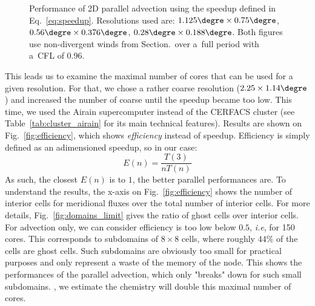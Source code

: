 \begin{figure}
  \hfill
  \caption{%
    Performance of 2D parallel advection using the speedup defined in
    Eq.~\eqref{eq:speedup}. Resolutions used are:
    $1.125{\degre}\times0.75\degre$, $0.56{\degre}\times0.376\degre$,
    $0.28{\degre}\times0.188\degre$. Both figures use non-divergent winds from
    Section.~\DIFdelbeginFL \DIFdelFL{\ref{sec:tests} }\DIFdelendFL \DIFaddbeginFL \DIFaddFL{\ref{sec2:tests} }\DIFaddendFL over a~full period with a~CFL of 0.96.
  }
\end{figure}

This leads us to examine the maximal number of cores that can be used for a
given resolution. For that, we chose a rather coarse resolution
($2.25\times1.14\degre$) and increased the number of coarse until the speedup
became too low. This time, we used the Airain supercomputer instead of the
CERFACS cluster (see Table~\ref{tab:cluster_airain} for its main technical features).
Results are shown on Fig.~\ref{fig:efficiency}, which shows \textit{efficiency}
instead of speedup. Efficiency is simply defined as an adimensioned speedup, so
in our case:
\begin{equation}
  E(n) =\frac{T(3)}{nT(n)}
\end{equation}
As such, the closest $E(n)$ is to $1$, the better parallel performances are.  To
understand the results, the x-axis on Fig.~\ref{fig:efficiency} shows the number
of interior cells for meridional fluxes over the total number of interior cells.
For more details, Fig.~\ref{fig:domains_limit} gives the ratio of ghost cells
over interior cells. For advection only, we can
consider efficiency is too low below $0.5$, \textit{i.e}, for 150 cores.
This corresponds to subdomains of $8\times8$ cells, where roughly
$44\%$ of the cells are ghost cells. Such subdomains are obviously too small
for practical purposes and only represent a waste of the memory of the node.
This shows the performances of the parallel advection, which only "breaks" down
for such small subdomains. \DIFdelbegin {}\DIFdelend \DIFaddbegin {}\degree\DIFaddend , we estimate
\DIFaddbegin {}\DIFaddend the chemistry will \DIFdelbegin {}\DIFdelend \DIFaddbegin {}\DIFaddend double this
maximal number of cores\DIFdelbegin {}\DIFdelend .


